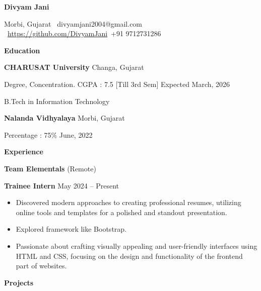 \documentclass[11pt]{article}
\begin{document}
\begin{center}
    \textbf{Divyam Jani}\\ 
    \hrulefill
\end{center}

\begin{center}
    Morbi, Gujarat \textbullet \ divyamjani2004@gmail.com \textbullet \  \url{https://github.com/DivyamJani}\textbullet \ +91 9712731286
\end{center}

\vspace{0.5pt}

\begin{center}
    \textbf{Education}
\end{center}
\textbf{CHARUSAT University} \hfill Changa, Gujarat

Degree, Concentration. CGPA : 7.5 [Till 3rd Sem] \hfill Expected March, 2026

B.Tech in Information Technology

\vspace{12pt}

\textbf{Nalanda Vidhyalaya} \hfill	Morbi, Gujarat

Percentage : 75\%
\hfill June, 2022 

\vspace{12pt}

\begin{center}
    \textbf{Experience}
\end{center}
\textbf{Team Elementals} \hfill (Remote)

\textbf{Trainee Intern} \hfill May 2024 – Present
\begin{itemize}[noitemsep, topsep=0pt, partopsep=0pt, parsep=0pt]
   \item Discovered modern approaches to creating professional resumes, utilizing online tools and templates for a polished and standout presentation.
    \item Explored framework like Bootstrap.
    \item Passionate about crafting visually appealing and user-friendly interfaces using HTML and CSS, focusing on the design and functionality of the frontend part of websites.
\end{itemize}

\vspace{12pt}



\begin{center}
    \textbf{Projects }
\end{center}
\end{document}
